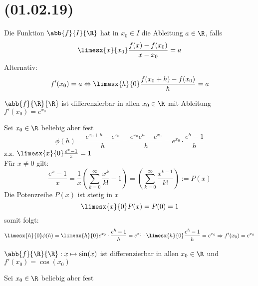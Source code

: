 \documentclass[../ana1u.tex]{subfiles}
\begin{document}
\setcounter{section}{11}
\section{(01.02.19)}
\begin{defi}
    Die Funktion \( \abb{f}{I}{\R} \) hat in \( x_0 \in I \) die Ableitung \(a \in \R \),
    falls 
    \[\limesx{x}{x_0} \frac{f(x) - f(x_0)}{x-x_0} = a \]
    Alternativ:
    \[f'(x_0) = a \Leftrightarrow \limesx{h}{0} \frac{f(x_0+h)-f(x_0)}{h} = a \] 
\end{defi}
\begin{bsp}
    \begin{beh}
        \(\abb{f}{\R}{\R} \) ist differenzierbar in allen \(x_0 \in \R \) mit Ableitung 
        \(f'(x_0) = e^{x_0} \)
    \end{beh}
    \begin{bew}
        Sei \(x_0 \in \R \) beliebig aber fest
        \[\phi(h) = \frac{e^{x_0+h}-e^{x_0}}{h} = \frac{e^{x_0}e^{h}-e^{x_0}}{h}
        = e^{x_0} \cdot \frac{e^{h} - 1}{h}\]
        z.z. \(\limesx{x}{0} \frac{e^{x}-1}{x} = 1 \) \\
        Für \(x \neq 0 \) gilt:
        \[\frac{e^{x}-1}{x} = \frac{1}{x} \left(\sum_{k=0}^{\infty} \frac{x^k}{k!} - 1\right)
        = \left(\sum_{k=0}^{\infty} \frac{x^{k-1}}{k!}\right) := P(x) \]  
        Die Potenzreihe \(P(x) \) ist stetig in \(x\)
        \[\limesx{x}{0} P(x) = P(0) = 1\]
        somit folgt:
        \[\limesx{h}{0} \phi(h) = \limesx{h}{0} e^{x_0} \cdot \frac{e^h - 1}{h} 
        = e^{x_0} \cdot \limesx{h}{0} \frac{e^h-1}{h} = e^{x_0} \Rightarrow f'(x_0) = e^{x_0}\]
    \end{bew}
\end{bsp}
\begin{bsp}
    \begin{beh}
        \(\abb{f}{\R}{\R}: x \mapsto \sin(x) \) ist differenzierbar in allen \(x_0 \in \R \)
        und \(f'(x_0) = \cos(x_0) \) 
    \end{beh}
    \begin{bew}
        Sei \(x_0 \in \R \) beliebig aber fest
    \end{bew}
\end{bsp}
\end{document}

